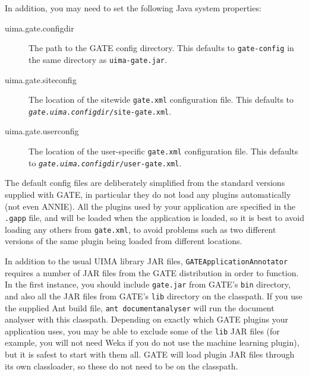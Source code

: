 In addition, you may need to set the following Java system properties:
\begin{description}
\item[uima.gate.configdir] The path to the GATE config directory.  This
defaults to \texttt{gate-config} in the same directory as
\texttt{uima-gate.jar}.
\item[uima.gate.siteconfig] The location of the sitewide \texttt{gate.xml}
configuration file.  This defaults to
\texttt{\textit{gate.uima.configdir}/site-gate.xml}.
\item[uima.gate.userconfig] The location of the user-specific \texttt{gate.xml}
configuration file.  This defaults to
\texttt{\textit{gate.uima.configdir}/user-gate.xml}.
\end{description}

The default config files are deliberately simplified from the standard versions
supplied with GATE, in particular they do not load any plugins automatically
(not even ANNIE).  All the plugins used by your application are specified in
the \texttt{.gapp} file, and will be loaded when the application is loaded, so
it is best to avoid loading any others from \texttt{gate.xml}, to avoid
problems such as two different versions of the same plugin being loaded from
different locations.

In addition to the usual UIMA library JAR files,
\texttt{GATEApplicationAnnotator} requires a number of JAR files from the GATE
distribution in order to function.  In the first instance, you should include
\texttt{gate.jar} from GATE's \texttt{bin} directory, and also all the JAR
files from GATE's \texttt{lib} directory on the classpath.  If you use the
supplied Ant build file, \texttt{ant documentanalyser} will run the document
analyser with this classpath.  Depending on exactly which GATE plugins your
application uses, you may be able to exclude some of the \texttt{lib} JAR
files (for example, you will not need Weka if you do not use the machine
learning plugin), but it is safest to start with them all.  GATE will load
plugin JAR files through its own classloader, so these do not need to be on the
classpath.
